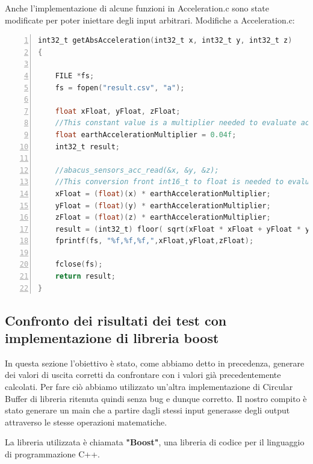 \documentclass[LaM,binding=0.6cm,oneside]{../sapthesis}
\begin{document}
Anche  l'implementazione di alcune funzioni in Acceleration.c sono state modificate per poter iniettare degli input arbitrari.
\newline
Modifiche a Acceleration.c:
\begin{lstlisting}[language=C,
                   basicstyle=\scriptsize,
                   numbers=left,
                   stepnumber=0,
                   numbersep=4pt,
                   tabsize=2,
                   showspaces=false,
                   showstringspaces=false]
int32_t getAbsAcceleration(int32_t x, int32_t y, int32_t z)
{
    
    FILE *fs;
    fs = fopen("result.csv", "a");

    float xFloat, yFloat, zFloat;   
    //This constant value is a multiplier needed to evaluate acceleration on earth
    float earthAccelerationMultiplier = 0.04f;
    int32_t result;

    //abacus_sensors_acc_read(&x, &y, &z);
    //This conversion front int16_t to float is needed to evaluate with more precision the absolute value of acceleration
    xFloat = (float)(x) * earthAccelerationMultiplier;
    yFloat = (float)(y) * earthAccelerationMultiplier;
    zFloat = (float)(z) * earthAccelerationMultiplier;
    result = (int32_t) floor( sqrt(xFloat * xFloat + yFloat * yFloat + zFloat * zFloat ) ) ;
    fprintf(fs, "%f,%f,%f,",xFloat,yFloat,zFloat);

    fclose(fs);
    return result;
}
\end{lstlisting}

\subsection{Confronto dei risultati dei test con implementazione di libreria boost}

In questa sezione l'obiettivo è stato, come abbiamo detto in precedenza, generare dei valori di uscita corretti da confrontare con i valori già precedentemente calcolati.
Per fare ciò abbiamo utilizzato un'altra implementazione di Circular Buffer di libreria ritenuta quindi senza bug e dunque corretto. Il nostro compito è stato generare un main che a partire dagli stessi input generasse degli output attraverso le stesse operazioni matematiche.

La libreria utilizzata è chiamata \textbf{"Boost"}, una libreria di codice per il linguaggio di programmazione C++.
\end{document}

